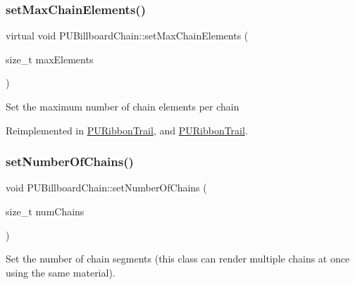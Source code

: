 \mbox{\label{classPUBillboardChain_ab530bb27f0a511663d96f742b1c8fbe3}} 
\subsubsection{\texorpdfstring{set\+Max\+Chain\+Elements()}{setMaxChainElements()}\hspace{0.1cm}{\footnotesize\ttfamily [2/2]}}
{\footnotesize\ttfamily virtual void P\+U\+Billboard\+Chain\+::set\+Max\+Chain\+Elements (\begin{DoxyParamCaption}\item[{size\+\_\+t}]{max\+Elements }\end{DoxyParamCaption})\hspace{0.3cm}{\ttfamily [virtual]}}

Set the maximum number of chain elements per chain 

Reimplemented in \hyperlink{classPURibbonTrail_af755423a7832221d273b9e2daae26dbe}{P\+U\+Ribbon\+Trail}, and \hyperlink{classPURibbonTrail_af755423a7832221d273b9e2daae26dbe}{P\+U\+Ribbon\+Trail}.

\mbox{\label{classPUBillboardChain_afb09bb4c28a0475beb2c6575c7eeffa5}} 
\subsubsection{\texorpdfstring{set\+Number\+Of\+Chains()}{setNumberOfChains()}\hspace{0.1cm}{\footnotesize\ttfamily [1/2]}}
{\footnotesize\ttfamily void P\+U\+Billboard\+Chain\+::set\+Number\+Of\+Chains (\begin{DoxyParamCaption}\item[{size\+\_\+t}]{num\+Chains }\end{DoxyParamCaption})\hspace{0.3cm}{\ttfamily [virtual]}}

Set the number of chain segments (this class can render multiple chains at once using the same material). 

